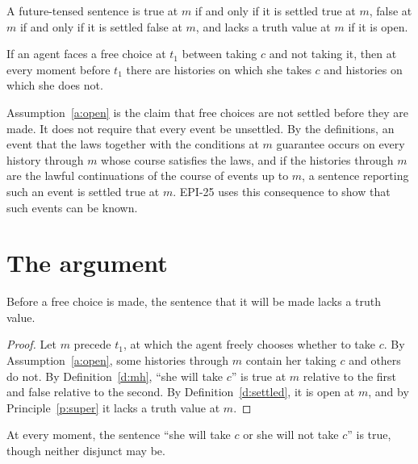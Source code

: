 \documentclass{situationist-preprint}
\begin{document}
\begin{principle}[Supervaluation]\label{p:super}
A future-tensed sentence is true at $m$ if and only if it is settled true at $m$, false at $m$ if and only if it is settled false at $m$, and lacks a truth value at $m$ if it is open.
\end{principle}

\begin{assumption}\label{a:open}
If an agent faces a free choice at $t_1$ between taking $c$ and not taking it, then at every moment before $t_1$ there are histories on which she takes $c$ and histories on which she does not.
\end{assumption}

Assumption~\ref{a:open} is the claim that free choices are not settled before they are made. It does not require that every event be unsettled. By the definitions, an event that the laws together with the conditions at $m$ guarantee occurs on every history through $m$ whose course satisfies the laws, and if the histories through $m$ are the lawful continuations of the course of events up to $m$, a sentence reporting such an event is settled true at $m$. EPI-25 uses this consequence to show that such events can be known.

\section{The argument}

\begin{theorem}\label{t:gap}
Before a free choice is made, the sentence that it will be made lacks a truth value.
\end{theorem}

\begin{proof}
Let $m$ precede $t_1$, at which the agent freely chooses whether to take $c$. By Assumption~\ref{a:open}, some histories through $m$ contain her taking $c$ and others do not. By Definition~\ref{d:mh}, \enquote{she will take $c$} is true at $m$ relative to the first and false relative to the second. By Definition~\ref{d:settled}, it is open at $m$, and by Principle~\ref{p:super} it lacks a truth value at $m$.
\end{proof}

\begin{proposition}\label{p:lem}
At every moment, the sentence \enquote{she will take $c$ or she will not take $c$} is true, though neither disjunct may be.
\end{proposition}
\end{document}
